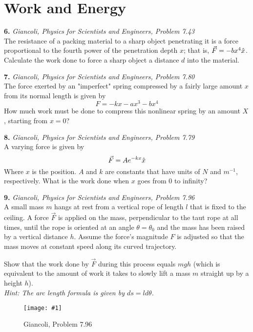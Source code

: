 \documentclass[11pt]{article}
\newcommand{\fig}[4]{
    \begin{figure}[H]
        \centering
        \texttt{[image: \#1]}
        \caption{#2}
        \label{exp4fit}
    \end{figure}
}
\theoremstyle{gangnamstyle}{\newtheorem{definition}{Definition}[]}
\theoremstyle{gangnamstyle}{\newtheorem{example}{Example}[]}
\theoremstyle{gangnamstyle}{\newtheorem{problem}{Problem}[]}
\begin{document}
\pagebreak

\section{Work and Energy}

\textbf{6.} \textit{Giancoli, Physics for Scientists and Engineers, Problem 7.43} \\
The resistance of a packing material to a sharp object penetrating it is a force proportional to the fourth power of the penetration depth $x$; that is, $\Vec{F} = -bx^4 \Hat{x}$. Calculate the work done to force a sharp object a distance $d$ into the material.

\pagebreak

\textbf{7.} \textit{Giancoli, Physics for Scientists and Engineers, Problem 7.80} \\
The force exerted by an "imperfect" spring compressed by a fairly large amount $x$ from its normal length is given by 
\[ F = -kx - ax^3 - bx^4 \]
How much work must be done to compress this nonlinear spring by an amount $X$, starting from $x = 0$?

\pagebreak

\textbf{8.} \textit{Giancoli, Physics for Scientists and Engineers, Problem 7.79} \\
A varying force is given by 
\[ \Vec{F} = Ae^{-kx}\Hat{x} \]
Where $x$ is the position. $A$ and $k$ are constants that have units of $N$ and $m^{-1}$, respectively. What is the work done when $x$ goes from $0$ to infinity?

\pagebreak

\textbf{9.} \textit{Giancoli, Physics for Scientists and Engineers, Problem 7.96} \\
A small mass $m$ hangs at rest from a vertical rope of length $l$ that is fixed to the ceiling. A force $\Vec{F}$ is applied on the mass, perpendicular to the taut rope at all times, until the rope is oriented at an angle $\theta = \theta_0$ and the mass has been raised by a vertical distance $h$. Assume the force’s magnitude $F$ is adjusted so that the mass moves at constant speed along its curved trajectory. 

Show that the work done by $\Vec{F}$ during this process equals $mgh$ (which is equivalent to the amount of work it takes to slowly lift a mass $m$ straight up by a height $h$). \\
\textit{Hint: The arc length formula is given by $ds = l d\theta$.}
\fig{figs/0711/giancoli96.png}{Giancoli, Problem 7.96}{0.5}{0} 
\end{document}
